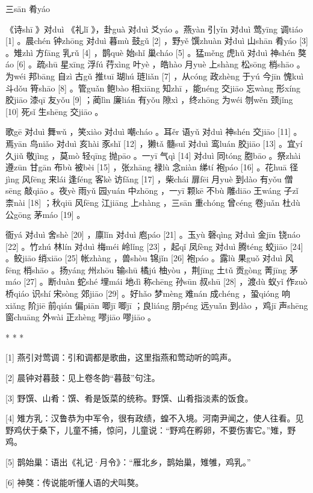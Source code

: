 \documentclass[12pt,UTF8]{ctexbook}
\begin{document}
三sān 肴yáo


《诗shī 》对duì 《礼lǐ 》，卦guà 对duì 爻yáo 。燕yàn 引yǐn 对duì 莺yīng 调tiáo [1] 。晨chén 钟zhōng 对duì 暮mù 鼓gǔ [2] ，野yě 馔zhuàn 对duì 山shān 肴yáo [3] 。雉zhì 方fāng 乳rǔ [4] ，鹊què 始shǐ 巢cháo [5] 。猛měng 虎hǔ 对duì 神shén 獒áo [6] 。疏shū 星xīng 浮fú 荇xìng 叶yè ，皓hào 月yuè 上shàng 松sōng 梢shāo 。为wéi 邦bāng 自zì 古gǔ 推tuī 瑚hú 琏liǎn [7] ，从cóng 政zhèng 于yú 今jīn 愧kuì 斗dǒu 筲shāo [8] 。管guǎn 鲍bào 相xiāng 知zhī ，能néng 交jiāo 忘wàng 形xíng 胶jiāo 漆qī 友yǒu [9] ；蔺lìn 廉lián 有yǒu 隙xì ，终zhōng 为wéi 刎wěn 颈jǐng [10] 死sǐ 生shēng 交jiāo 。

歌gē 对duì 舞wǔ ，笑xiào 对duì 嘲cháo 。耳ěr 语yǔ 对duì 神shén 交jiāo [11] 。焉yān 鸟niǎo 对duì 亥hài 豕shǐ [12] ，獭tǎ 髓suǐ 对duì 鸾luán 胶jiāo [13] 。宜yí 久jiǔ 敬jìng ，莫mò 轻qīng 抛pāo 。一yī 气qì [14] 对duì 同tóng 胞bāo 。祭zhài 遵zūn 甘gān 布bù 被bèi [15] ，张zhāng 禄lù 念niàn 绨tí 袍páo [16] 。花huā 径jìng 风fēng 来lái 逢féng 客kè 访fǎng [17] ，柴chái 扉fēi 月yuè 到dào 有yǒu 僧sēng 敲qiāo 。夜yè 雨yǔ 园yuán 中zhōng ，一yī 颗kē 不bù 雕diāo 王wáng 子zǐ 柰nài [18] ；秋qiū 风fēng 江jiāng 上shàng ，三sān 重chóng 曾céng 卷juǎn 杜dù 公gōng 茅máo [19] 。

衙yá 对duì 舍shè [20] ，廪lǐn 对duì 庖páo [21] 。玉yù 磬qìng 对duì 金jīn 铙náo [22] 。竹zhú 林lín 对duì 梅méi 岭lǐng [23] ，起qǐ 凤fèng 对duì 腾téng 蛟jiāo [24] 。鲛jiāo 绡xiāo [25] 帐zhàng ，兽shòu 锦jǐn [26] 袍páo 。露lù 果guǒ 对duì 风fēng 梢shāo 。扬yáng 州zhōu 输shū 橘jú 柚yòu ，荆jīng 土tǔ 贡gòng 菁jīng 茅máo [27] 。断duàn 蛇shé 埋mái 地dì 称chēng 孙sūn 叔shū [28] ，渡dù 蚁yǐ 作zuò 桥qiáo 识shí 宋sòng 郊jiāo [29] 。好hǎo 梦mèng 难nán 成chéng ，蛩qióng 响xiǎng 阶jiē 前qián 偏piān 唧jī 唧jī ；良liáng 朋péng 远yuǎn 到dào ，鸡jī 声shēng 窗chuāng 外wài 正zhèng 嘐jiāo 嘐jiāo 。



* * *



[1] 燕引对莺调：引和调都是歌曲，这里指燕和莺动听的鸣声。

[2] 晨钟对暮鼓：见上卷冬韵“暮鼓”句注。

[3] 野馔、山肴：馔、肴是饭菜的统称。野馔、山肴指淡素的饭食。

[4] 雉方乳：汉鲁恭为中军令，很有政绩，蝗不入境。河南尹闻之，使人往看。见野鸡伏于桑下，儿童不捕，惊问，儿童说：“野鸡在孵卵，不要伤害它。”雉，野鸡。

[5] 鹊始巢：语出《礼记·月令》：“雁北乡，鹊始巢，雉雊，鸡乳。”

[6] 神獒：传说能听懂人语的犬叫獒。
\end{document}
